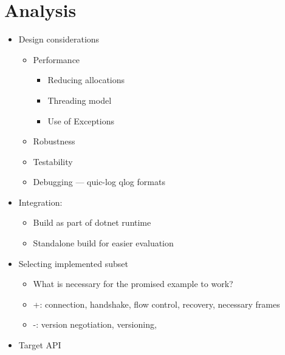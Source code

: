 \chapter{Analysis}\label{chap:03-analysis}
\begin{itemize}

    \item Design considerations
    \begin{itemize}

        \item Performance
        \begin{itemize}

            \item Reducing allocations
            \item Threading model
            \item Use of Exceptions

        \end{itemize}

        \item Robustness

        \item Testability

        \item Debugging --- quic-log qlog formats

    \end{itemize}

    \item Integration:
    \begin{itemize}

        \item Build as part of dotnet runtime
        \item Standalone build for easier evaluation

    \end{itemize}

    \item Selecting implemented subset
    \begin{itemize}

        \item What is necessary for the promised example to work?
        \item +: connection, handshake, flow control, recovery, necessary frames
        \item -: version negotiation, versioning,

    \end{itemize}

    \item Target API
    \begin{itemize}


\end{itemize}
\end{itemize}
